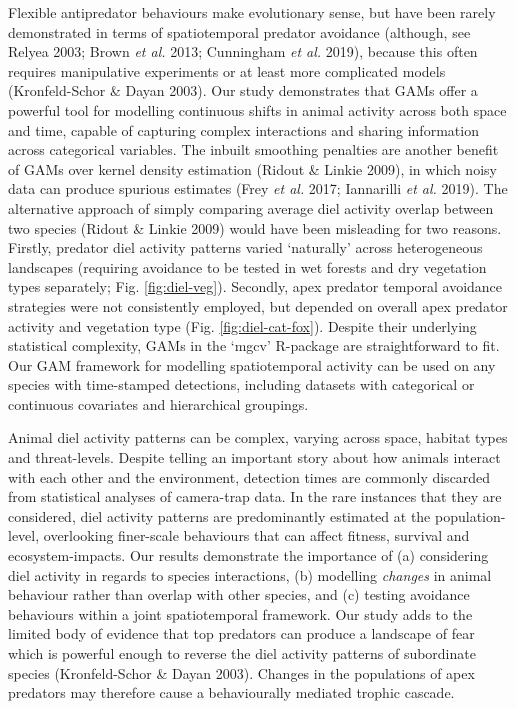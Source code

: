 \documentclass[11pt,a4paper,titlepage,twoside,openright]{style/unimelbthesis}
\begin{document}
\begin{mainmatter}
Flexible antipredator behaviours make evolutionary sense, but have been rarely demonstrated in terms of spatiotemporal predator avoidance (although, see Relyea 2003; Brown \emph{et al.} 2013; Cunningham \emph{et al.} 2019), because this often requires manipulative experiments or at least more complicated models (Kronfeld-Schor \& Dayan 2003). Our study demonstrates that GAMs offer a powerful tool for modelling continuous shifts in animal activity across both space and time, capable of capturing complex interactions and sharing information across categorical variables. The inbuilt smoothing penalties are another benefit of GAMs over kernel density estimation (Ridout \& Linkie 2009), in which noisy data can produce spurious estimates (Frey \emph{et al.} 2017; Iannarilli \emph{et al.} 2019). The alternative approach of simply comparing average diel activity overlap between two species (Ridout \& Linkie 2009) would have been misleading for two reasons. Firstly, predator diel activity patterns varied `naturally' across heterogeneous landscapes (requiring avoidance to be tested in wet forests and dry vegetation types separately; Fig. \ref{fig:diel-veg}). Secondly, apex predator temporal avoidance strategies were not consistently employed, but depended on overall apex predator activity and vegetation type (Fig. \ref{fig:diel-cat-fox}). Despite their underlying statistical complexity, GAMs in the `mgcv' R-package are straightforward to fit. Our GAM framework for modelling spatiotemporal activity can be used on any species with time-stamped detections, including datasets with categorical or continuous covariates and hierarchical groupings.

Animal diel activity patterns can be complex, varying across space, habitat types and threat-levels. Despite telling an important story about how animals interact with each other and the environment, detection times are commonly discarded from statistical analyses of camera-trap data. In the rare instances that they are considered, diel activity patterns are predominantly estimated at the population-level, overlooking finer-scale behaviours that can affect fitness, survival and ecosystem-impacts. Our results demonstrate the importance of (a) considering diel activity in regards to species interactions, (b) modelling \emph{changes} in animal behaviour rather than overlap with other species, and (c) testing avoidance behaviours within a joint spatiotemporal framework. Our study adds to the limited body of evidence that top predators can produce a landscape of fear which is powerful enough to reverse the diel activity patterns of subordinate species (Kronfeld-Schor \& Dayan 2003). Changes in the populations of apex predators may therefore cause a behaviourally mediated trophic cascade.


\end{mainmatter}
\end{document}
